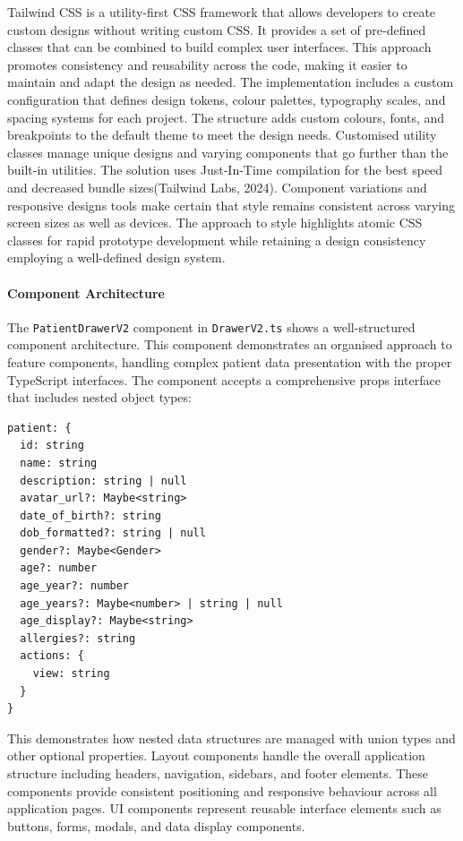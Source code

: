 Tailwind CSS is a utility-first CSS framework that allows developers to create custom designs without writing custom CSS. It provides a set of pre-defined classes that can be combined to build complex user interfaces. This approach promotes consistency and reusability across the code, making it easier to maintain and adapt the design as needed.
The implementation includes a custom configuration that defines design tokens, colour palettes, typography scales, and spacing systems for each project. The structure adds custom colours, fonts, and breakpoints to the default theme to meet the design needs. Customised utility classes manage unique designs and varying components  that go further than the built-in utilities. The solution uses Just-In-Time compilation for the best speed and decreased bundle sizes(Tailwind Labs, 2024). Component variations and responsive designs tools make certain that style remains consistent across varying screen sizes as well as devices. The approach to style highlights atomic CSS classes for rapid prototype development while retaining a design consistency employing a well-defined design system.

\paragraph{Component Architecture}\mbox{}

The \texttt{PatientDrawerV2} component in \texttt{DrawerV2.ts} shows a well-structured component architecture. This component demonstrates an organised approach to feature components, handling complex patient data presentation with the proper TypeScript interfaces.
The component accepts a comprehensive props interface that includes nested object types:

\begin{verbatim}
patient: {
  id: string
  name: string
  description: string | null
  avatar_url?: Maybe<string>
  date_of_birth?: string
  dob_formatted?: string | null
  gender?: Maybe<Gender>
  age?: number
  age_year?: number
  age_years?: Maybe<number> | string | null
  age_display?: Maybe<string>
  allergies?: string
  actions: {
    view: string
  }
}
\end{verbatim}

This demonstrates how nested data structures are managed with union types and other optional properties.
Layout components handle the overall application structure including headers, navigation, sidebars, and footer elements. These components provide consistent positioning and responsive behaviour across all application pages. UI components represent reusable interface elements such as buttons, forms, modals, and data display components.
